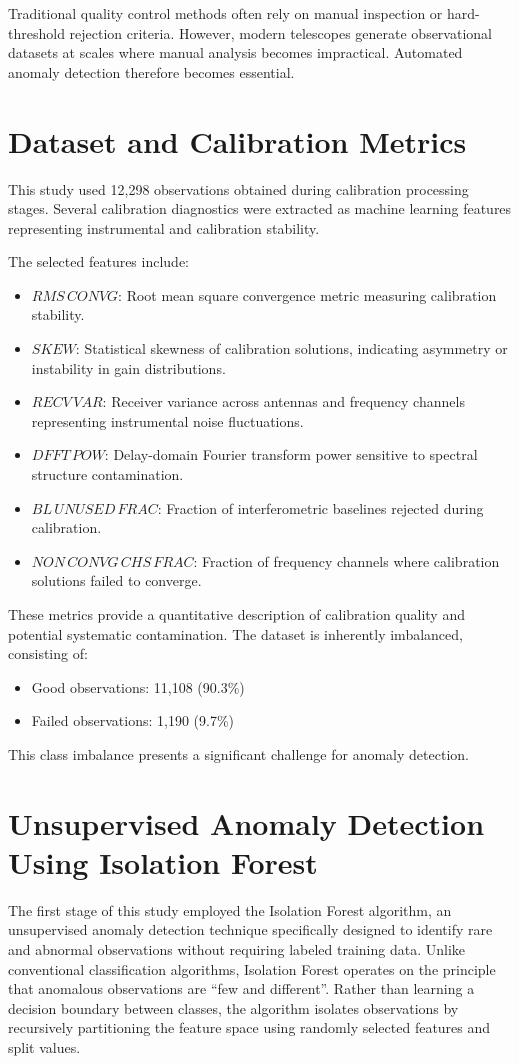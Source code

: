 \documentclass[linenumbers,trackchanges]{aastex701}
\begin{document}
Traditional quality control methods often rely on manual inspection or hard-threshold rejection criteria. However, modern telescopes generate observational datasets at scales where manual analysis becomes impractical. Automated anomaly detection therefore becomes essential.

\section{Dataset and Calibration Metrics}

This study used 12,298 observations obtained during calibration processing stages. Several calibration diagnostics were extracted as machine learning features representing instrumental and calibration stability.

The selected features include:
\begin{itemize}
\item $RMS\,CONVG$: Root mean square convergence metric measuring calibration stability.
\item $SKEW$: Statistical skewness of calibration solutions, indicating asymmetry or instability in gain distributions.
\item $RECV\,VAR$: Receiver variance across antennas and frequency channels representing instrumental noise fluctuations.
\item $DFFT\,POW$: Delay-domain Fourier transform power sensitive to spectral structure contamination.
\item $BL\,UNUSED\,FRAC$: Fraction of interferometric baselines rejected during calibration.
\item $NON\,CONVG\,CHS\,FRAC$: Fraction of frequency channels where calibration solutions failed to converge.
\end{itemize}
These metrics provide a quantitative description of calibration quality and potential systematic contamination. The dataset is inherently imbalanced, consisting of:
\begin{itemize}
\item Good observations: 11,108 (90.3\%)
\item Failed observations: 1,190 (9.7\%)
\end{itemize}
This class imbalance presents a significant challenge for anomaly detection.

\section{Unsupervised Anomaly Detection Using Isolation Forest}
The first stage of this study employed the Isolation Forest algorithm, an unsupervised anomaly detection technique specifically designed to identify rare and abnormal observations without requiring labeled training data. Unlike conventional classification algorithms, Isolation Forest operates on the principle that anomalous observations are ``few and different''. Rather than learning a decision boundary between classes, the algorithm isolates observations by recursively partitioning the feature space using randomly selected features and split values.
\end{document}
